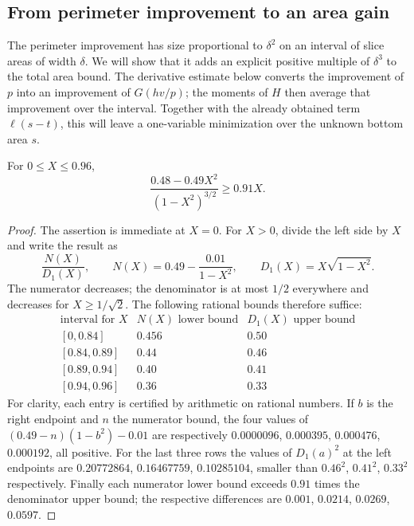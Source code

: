 \subsection{From perimeter improvement to an area gain}

The perimeter improvement has size proportional to $\delta^2$ on
an interval of slice areas of width $\delta$. We will show that it
adds an explicit positive multiple of $\delta^3$ to the total area
bound. The derivative estimate below converts the improvement of $p$
into an improvement of $G(hv/p)$; the moments of $H$ then average
that improvement over the interval. Together with the already obtained
term $\ell(s-t)$, this will leave a one-variable minimization over
the unknown bottom area $s$.

\begin{lemma}\label{nest:derivative-bound}
For $0\leq X\leq0.96$,
\begin{equation}\label{nest:derivative-inequality}
 \frac{0.48-0.49X^2}{(1-X^2)^{3/2}}\geq0.91X.
\end{equation}
\end{lemma}

\begin{proof}
The assertion is immediate at $X=0$.  For $X>0$, divide the left
side by $X$ and write the result as
\[
 \frac{N(X)}{D_1(X)},\qquad
 N(X)=0.49-\frac{0.01}{1-X^2},\qquad
 D_1(X)=X\sqrt{1-X^2}.
\]
The numerator decreases; the denominator is at most $1/2$ everywhere
and decreases for $X\geq1/\sqrt2$.  The following rational bounds
therefore suffice:
\[
\begin{array}{c|cc}
 \text{interval for }X&N(X)\text{ lower bound}&D_1(X)\text{ upper bound}\\
 \hline
 {[0,0.84]}&0.456&0.50\\
 {[0.84,0.89]}&0.44&0.46\\
 {[0.89,0.94]}&0.40&0.41\\
 {[0.94,0.96]}&0.36&0.33
\end{array}
\]
For clarity, each entry is certified by arithmetic on rational
numbers.  If $b$ is the right endpoint and $n$ the numerator bound,
the four values of $(0.49-n)(1-b^2)-0.01$ are respectively
$0.0000096$, $0.000395$, $0.000476$, $0.000192$, all positive.
For the last three rows the values of $D_1(a)^2$ at the left
endpoints are $0.20772864$, $0.16467759$, $0.10285104$, smaller
than $0.46^2$, $0.41^2$, $0.33^2$ respectively.
Finally each numerator lower bound exceeds $0.91$ times the
denominator upper bound; the respective differences are
$0.001$, $0.0214$, $0.0269$, $0.0597$.
\end{proof}

